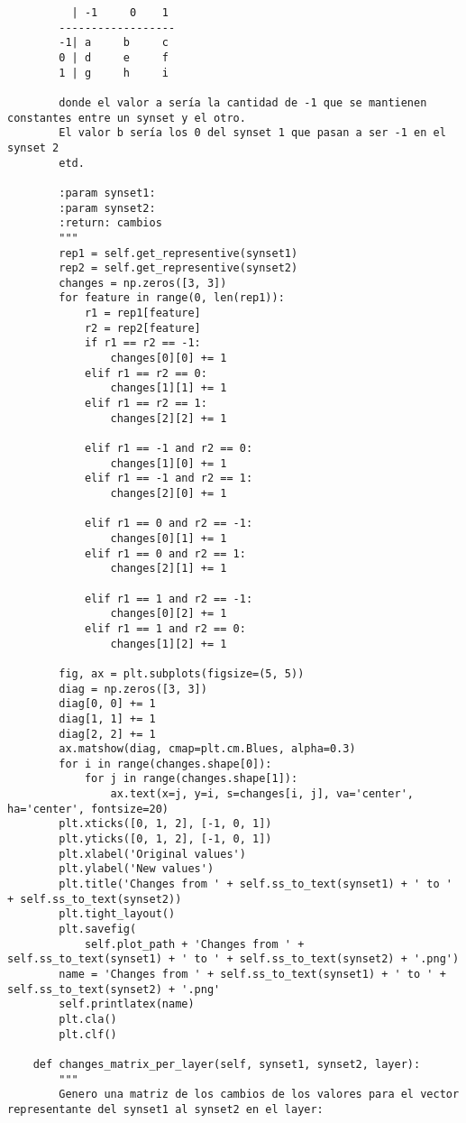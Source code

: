\documentclass[12,twoside]{TFG-GM}
\theoremstyle{definition}
\theoremstyle{remark}
\begin{document}
\begin{verbatim}
          | -1     0    1
        ------------------
        -1| a     b     c
        0 | d     e     f
        1 | g     h     i

        donde el valor a sería la cantidad de -1 que se mantienen constantes entre un synset y el otro.
        El valor b sería los 0 del synset 1 que pasan a ser -1 en el synset 2
        etd.

        :param synset1:
        :param synset2:
        :return: cambios
        """
        rep1 = self.get_representive(synset1)
        rep2 = self.get_representive(synset2)
        changes = np.zeros([3, 3])
        for feature in range(0, len(rep1)):
            r1 = rep1[feature]
            r2 = rep2[feature]
            if r1 == r2 == -1:
                changes[0][0] += 1
            elif r1 == r2 == 0:
                changes[1][1] += 1
            elif r1 == r2 == 1:
                changes[2][2] += 1

            elif r1 == -1 and r2 == 0:
                changes[1][0] += 1
            elif r1 == -1 and r2 == 1:
                changes[2][0] += 1

            elif r1 == 0 and r2 == -1:
                changes[0][1] += 1
            elif r1 == 0 and r2 == 1:
                changes[2][1] += 1

            elif r1 == 1 and r2 == -1:
                changes[0][2] += 1
            elif r1 == 1 and r2 == 0:
                changes[1][2] += 1

        fig, ax = plt.subplots(figsize=(5, 5))
        diag = np.zeros([3, 3])
        diag[0, 0] += 1
        diag[1, 1] += 1
        diag[2, 2] += 1
        ax.matshow(diag, cmap=plt.cm.Blues, alpha=0.3)
        for i in range(changes.shape[0]):
            for j in range(changes.shape[1]):
                ax.text(x=j, y=i, s=changes[i, j], va='center', ha='center', fontsize=20)
        plt.xticks([0, 1, 2], [-1, 0, 1])
        plt.yticks([0, 1, 2], [-1, 0, 1])
        plt.xlabel('Original values')
        plt.ylabel('New values')
        plt.title('Changes from ' + self.ss_to_text(synset1) + ' to ' + self.ss_to_text(synset2))
        plt.tight_layout()
        plt.savefig(
            self.plot_path + 'Changes from ' + self.ss_to_text(synset1) + ' to ' + self.ss_to_text(synset2) + '.png')
        name = 'Changes from ' + self.ss_to_text(synset1) + ' to ' + self.ss_to_text(synset2) + '.png'
        self.printlatex(name)
        plt.cla()
        plt.clf()

    def changes_matrix_per_layer(self, synset1, synset2, layer):
        """
        Genero una matriz de los cambios de los valores para el vector representante del synset1 al synset2 en el layer:


\end{verbatim}
\end{document}
